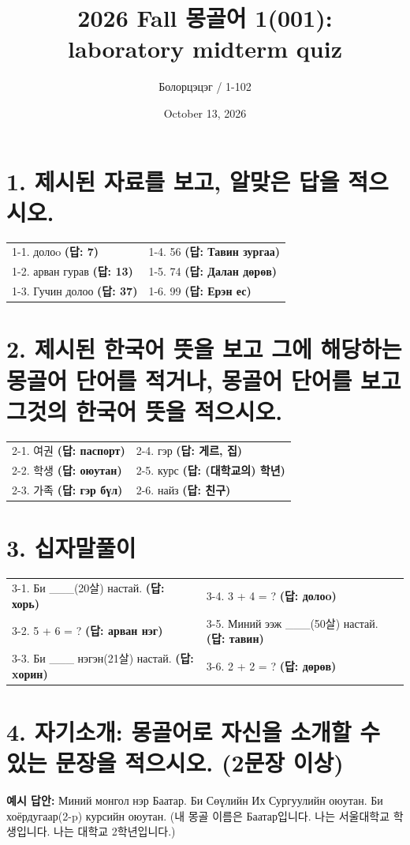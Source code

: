 \documentclass[11pt]{article}
\title{2026 Fall 몽골어 1(001): \\ \medskip \large{laboratory midterm quiz}}
\author{Болорцэцэг  /  1-102}
\date{October 13, 2026}
\begin{document}
\maketitle

\section{1. 제시된 자료를 보고, 알맞은 답을 적으시오.}
\bigskip
\noindent
\begin{tabular}{@{}p{}p{}@{}}
  1-1. долоo \textbf{(답: 7)} &
  1-4. 56 \textbf{(답: Тавин зургаа)} \\
  [0.8em]
  1-2. арван гурав \textbf{(답: 13)} &
  1-5. 74 \textbf{(답: Далан дөрөв)} \\
  [0.8em]
  1-3. Гучин долоо \textbf{(답: 37)} &
  1-6. 99 \textbf{(답: Ерэн ес)}
\end{tabular}
\bigskip

\section{2. 제시된 한국어 뜻을 보고 그에 해당하는 몽골어 단어를 적거나, 몽골어 단어를 보고 그것의 한국어 뜻을 적으시오.}
\bigskip
\noindent
\begin{tabular}{@{}p{}p{}@{}}
  2-1. 여권 \textbf{(답: паспорт)} &
  2-4. гэр \textbf{(답: 게르, 집)} \\
  [0.8em]
  2-2. 학생 \textbf{(답: оюутан)} &
  2-5. курс \textbf{(답: (대학교의) 학년)} \\
  [0.8em]
  2-3. 가족 \textbf{(답: гэр бүл)} &
  2-6. найз \textbf{(답: 친구)}
\end{tabular}
\bigskip  

\section[3. 십자말풀이]{3. 십자말풀이\footnotemark}
\bigskip
\noindent
\begin{tabular}{@{}p{}p{}@{}}
  3-1. Би \_\_\_(20살) настай. \textbf{(답: хорь)} &
  3-4. 3 + 4 = ? \textbf{(답: долоo)} \\
  [0.8em]
  3-2. 5 + 6 = ? \textbf{(답: арван нэг)} &
  3-5. Миний ээж \_\_\_(50살) настай. \textbf{(답: тавин)} \\
  [0.8em]
  3-3. Би \_\_\_ нэгэн(21살) настай. \textbf{(답: xорин)} &
  3-6. 2 + 2 = ? \textbf{(답: дөрөв)}
\end{tabular}
\bigskip

\section{4. 자기소개: 몽골어로 자신을 소개할 수 있는 문장을 적으시오. (2문장 이상)}
\medskip
\noindent \textbf{예시 답안:} Миний монгол нэр Баатар. Би Сөүлийн Их Сургуулийн оюутан. Би хоёрдугаар(2-p) курсийн оюутан. 
(내 몽골 이름은 Баатар입니다. 나는 서울대학교 학생입니다. 나는 대학교 2학년입니다.)
\end{document}
